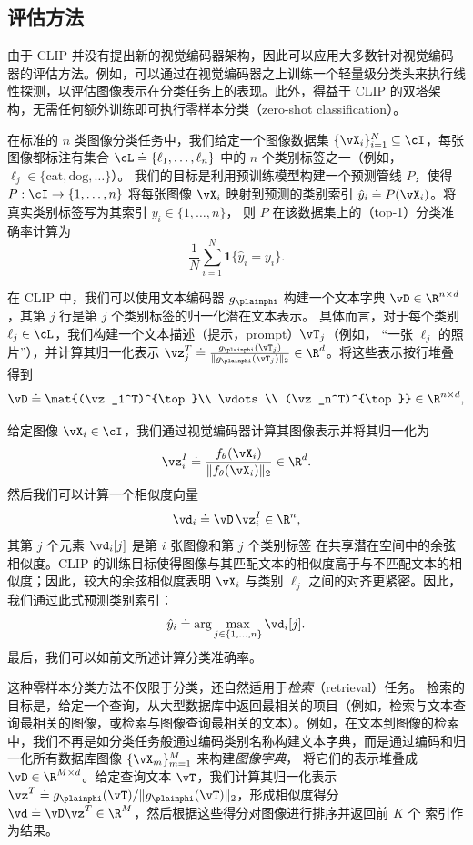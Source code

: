 \documentclass[../../book-main_zh.tex]{subfiles}
\begin{document}
\subsection{评估方法}\label{sub:clip_eval}
由于 CLIP 并没有提出新的视觉编码器架构，因此可以应用大多数针对视觉编码器的评估方法。例如，可以通过在视觉编码器之上训练一个轻量级分类头来执行线性探测，以评估图像表示在分类任务上的表现。此外，得益于 CLIP 的双塔架构，无需任何额外训练即可执行零样本分类（zero-shot classification）。

在标准的 \(n\) 类图像分类任务中，我们给定一个图像数据集
\(\{\vX_i\}_{i=1}^{N}\subseteq\cI\)，每张图像都标注有集合
\(\cL \doteq \{\ell_1,\ldots,\ell_n\}\) 中的 \(n\) 个类别标签之一（例如，\(\ell_j \in \{\text{cat},\text{dog},\ldots\}\)）。
我们的目标是利用预训练模型构建一个预测管线 \(P\)，使得
\(P:\cI\to\{1,\ldots,n\}\) 将每张图像 \(\vX_i\) 映射到预测的类别索引
\(\hat{y}_i \doteq P(\vX_i)\)。将真实类别标签写为其索引 \(y_i \in \{1,\ldots,n\}\)，
则 \(P\) 在该数据集上的（top-1）分类准确率计算为
\[
\frac{1}{N}\sum_{i=1}^{N}\boldsymbol{1}\{\hat{y}_i = y_i\}.
\]

在 CLIP 中，我们可以使用文本编码器 \(g_{\plainphi}\) 构建一个文本字典 \(\vD\in\R^{n\times d}\)，其第 \(j\) 行是第 \(j\) 个类别标签的归一化潜在文本表示。
具体而言，对于每个类别 \(\ell_j \in \cL\)，我们构建一个文本描述（提示，prompt）\(\vT_j\)（例如，
“一张 \(\ell_j\) 的照片”），并计算其归一化表示
\(\vz_j^T \doteq \frac{g_{\plainphi}(\vT_j)}{\|g_{\plainphi}(\vT_j)\|_2} \in \R^{d}\)。将这些表示按行堆叠得到
\[
\vD \doteq 
\mat{(\vz_1^T)^{\top}\\ \vdots \\ (\vz_n^T)^{\top}}
\in \R^{n\times d},
\]

给定图像 \(\vX_i \in \cI\)，我们通过视觉编码器计算其图像表示并将其归一化为
\[
\vz_i^I \doteq \frac{f_{\theta}(\vX_i)}{\|f_{\theta}(\vX_i)\|_2} \in \R^{d}.
\]
然后我们可以计算一个相似度向量
\[
\vd_i \doteq \vD\,\vz_i^I \in \R^{n},
\]
其第 \(j\) 个元素 \(\vd_i[j]\) 是第 \(i\) 张图像和第 \(j\) 个类别标签
在共享潜在空间中的余弦相似度。CLIP 的训练目标使得图像与其匹配文本的相似度高于与不匹配文本的相似度；因此，较大的余弦相似度表明
\(\vX_i\) 与类别 \(\ell_j\) 之间的对齐更紧密。因此，我们通过此式预测类别索引：
\[
\hat{y}_i \doteq \arg\max_{j \in \{1,\ldots,n\}} \vd_i[j].
\]
最后，我们可以如前文所述计算分类准确率。 

这种零样本分类方法不仅限于分类，还自然适用于\emph{检索}（retrieval）任务。
检索的目标是，给定一个查询，从大型数据库中返回最相关的项目（例如，检索与文本查询最相关的图像，或检索与图像查询最相关的文本）。例如，在文本到图像的检索中，我们不再是如分类任务般通过编码类别名称构建文本字典，而是通过编码和归一化所有数据库图像 \(\{\vX_m\}_{m=1}^{M}\) 来构建\emph{图像字典}，
将它们的表示堆叠成
\(\vD\in\R^{M\times d}\)。给定查询文本 \(\vT\)，我们计算其归一化表示
\(\vz^T \doteq g_{\plainphi}(\vT)/\|g_{\plainphi}(\vT)\|_2\)，形成相似度得分
\(\vd \doteq \vD\vz^T\in\R^{M}\)，然后根据这些得分对图像进行排序并返回前 \(K\) 个
索引作为结果。 
\end{document}
